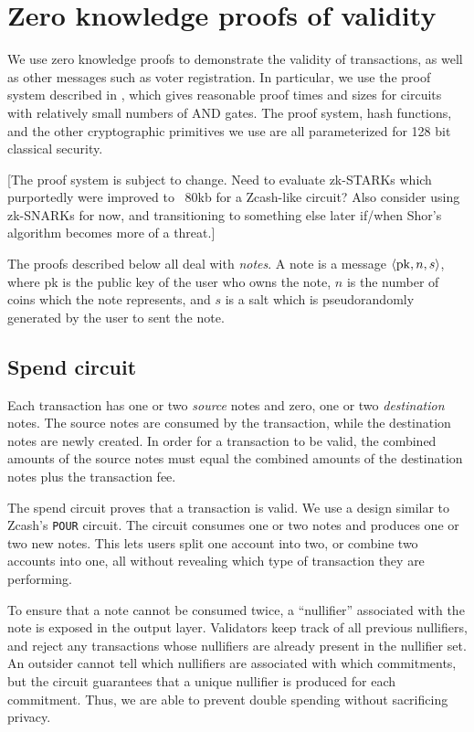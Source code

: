 \section{Zero knowledge proofs of validity}
\label{proofs}

We use zero knowledge proofs to demonstrate the validity of transactions, as well as other messages such as voter registration. In particular, we use the proof system described in \cite{katz2018improved}, which gives reasonable proof times and sizes for circuits with relatively small numbers of AND gates. The proof system, hash functions, and the other cryptographic primitives we use are all parameterized for 128 bit classical security.

[The proof system is subject to change. Need to evaluate zk-STARKs which purportedly were improved to ~80kb for a Zcash-like circuit? Also consider using zk-SNARKs for now, and transitioning to something else later if/when Shor's algorithm becomes more of a threat.]

The proofs described below all deal with \emph{notes}. A note is a message $\langle\mathrm{pk}, n, s\rangle$, where pk is the public key of the user who owns the note, $n$ is the number of coins which the note represents, and $s$ is a salt which is pseudorandomly generated by the user to sent the note.


\subsection{Spend circuit}
\label{spend-circuit}

Each transaction has one or two \emph{source} notes and zero, one or two \emph{destination} notes. The source notes are consumed by the transaction, while the destination notes are newly created. In order for a transaction to be valid, the combined amounts of the source notes must equal the combined amounts of the destination notes plus the transaction fee.

The spend circuit proves that a transaction is valid. We use a design similar to Zcash's \texttt{POUR} circuit. The circuit consumes one or two notes and produces one or two new notes. This lets users split one account into two, or combine two accounts into one, all without revealing which type of transaction they are performing.

To ensure that a note cannot be consumed twice, a ``nullifier'' associated with the note is exposed in the output layer. Validators keep track of all previous nullifiers, and reject any transactions whose nullifiers are already present in the nullifier set. An outsider cannot tell which nullifiers are associated with which commitments, but the circuit guarantees that a unique nullifier is produced for each commitment. Thus, we are able to prevent double spending without sacrificing privacy.

